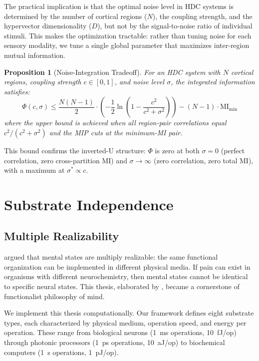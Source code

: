 \documentclass[12pt]{book}
\newtheorem{proposition}[theorem]{Proposition}
\begin{document}
The practical implication is that the optimal noise level in HDC systems is determined by the number of cortical regions ($N$), the coupling strength, and the hypervector dimensionality ($D$), but not by the signal-to-noise ratio of individual stimuli. This makes the optimization tractable: rather than tuning noise for each sensory modality, we tune a single global parameter that maximizes inter-region mutual information.

\begin{proposition}[Noise-Integration Tradeoff]
For an HDC system with $N$ cortical regions, coupling strength $c \in [0, 1]$, and noise level $\sigma$, the integrated information satisfies:
\begin{equation}
\Phi(c, \sigma) \leq \frac{N(N-1)}{2} \cdot \left(-\frac{1}{2}\ln\left(1 - \frac{c^2}{c^2 + \sigma^2}\right)\right) - (N-1) \cdot \text{MI}_{\text{min}}
\end{equation}
where the upper bound is achieved when all region-pair correlations equal $c^2/(c^2 + \sigma^2)$ and the MIP cuts at the minimum-MI pair.
\end{proposition}

This bound confirms the inverted-U structure: $\Phi$ is zero at both $\sigma = 0$ (perfect correlation, zero cross-partition MI) and $\sigma \to \infty$ (zero correlation, zero total MI), with a maximum at $\sigma^* \propto c$.


\chapter{Substrate Independence}
\label{ch:substrate}

\section{Multiple Realizability}

\citet{putnam1967psychological} argued that mental states are multiply realizable: the same functional organization can be implemented in different physical media. If pain can exist in organisms with different neurochemistry, then mental states cannot be identical to specific neural states. This thesis, elaborated by \citet{fodor1974special}, became a cornerstone of functionalist philosophy of mind.

We implement this thesis computationally. Our framework defines eight substrate types, each characterized by physical medium, operation speed, and energy per operation. These range from biological neurons (1~ms operations, 10~fJ/op) through photonic processors (1~ps operations, 10~aJ/op) to biochemical computers (1~s operations, 1~pJ/op).
\end{document}

